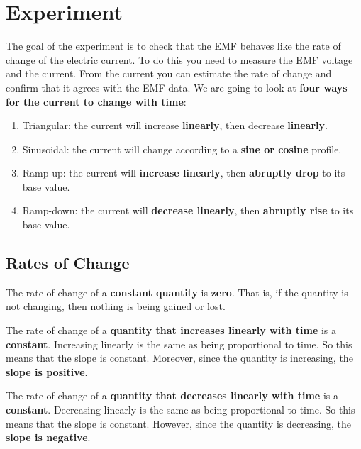 \section{Experiment}
The goal of the experiment is to check that the EMF behaves like the rate of change of the electric current. To do this you need to measure the EMF voltage and the current. From the current you can estimate the rate of change and confirm that it agrees with the EMF data. We are going to look at \textbf{four ways for the current to change with time}:
\begin{enumerate}
	\item Triangular: the current will increase \textbf{linearly}, then decrease \textbf{linearly}.
	\item Sinusoidal: the current will change according to a \textbf{sine or cosine} profile.
	\item Ramp-up: the current will \textbf{increase linearly}, then \textbf{abruptly drop} to its base value.
	\item Ramp-down: the current will \textbf{decrease linearly}, then \textbf{abruptly rise} to its base value.
\end{enumerate}
\subsection{Rates of Change}
The rate of change of a \textbf{constant quantity} is \textbf{zero}. That is, if the quantity is not changing, then nothing is being gained or lost.

The rate of change of a \textbf{quantity that increases linearly with time} is a \textbf{constant}. Increasing linearly is the same as being proportional to time. So this means that the slope is constant. Moreover, since the quantity is increasing, the \textbf{slope is positive}.

The rate of change of a \textbf{quantity that decreases linearly with time} is a \textbf{constant}. Decreasing linearly is the same as being proportional to time. So this means that the slope is constant. However, since the quantity is decreasing, the \textbf{slope is negative}.

